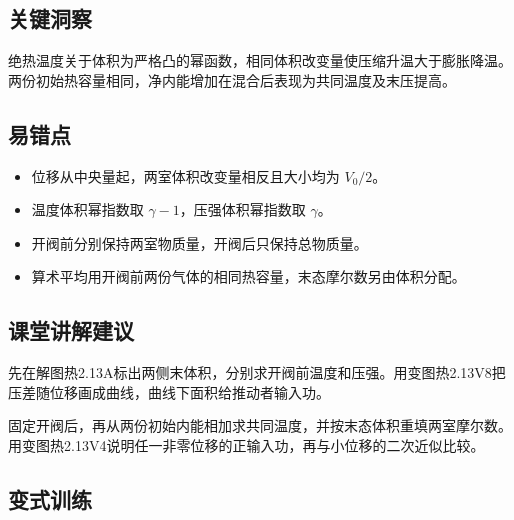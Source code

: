 \documentclass[UTF8,fontset=fandol,a4paper,11pt]{ctexart}
\begin{document}


\subsection*{关键洞察}

绝热温度关于体积为严格凸的幂函数，相同体积改变量使压缩升温大于膨胀降温。两份初始热容量相同，净内能增加在混合后表现为共同温度及末压提高。



\subsection*{易错点}

\begin{itemize}
\item 位移从中央量起，两室体积改变量相反且大小均为 $V_0/2$。
\item 温度体积幂指数取 $\gamma-1$，压强体积幂指数取 $\gamma$。
\item 开阀前分别保持两室物质量，开阀后只保持总物质量。
\item 算术平均用开阀前两份气体的相同热容量，末态摩尔数另由体积分配。
\end{itemize}



\subsection*{课堂讲解建议}

先在解图热2.13A标出两侧末体积，分别求开阀前温度和压强。用变图热2.13V8把压差随位移画成曲线，曲线下面积给推动者输入功。

固定开阀后，再从两份初始内能相加求共同温度，并按末态体积重填两室摩尔数。用变图热2.13V4说明任一非零位移的正输入功，再与小位移的二次近似比较。



\subsection*{变式训练}
\end{document}
